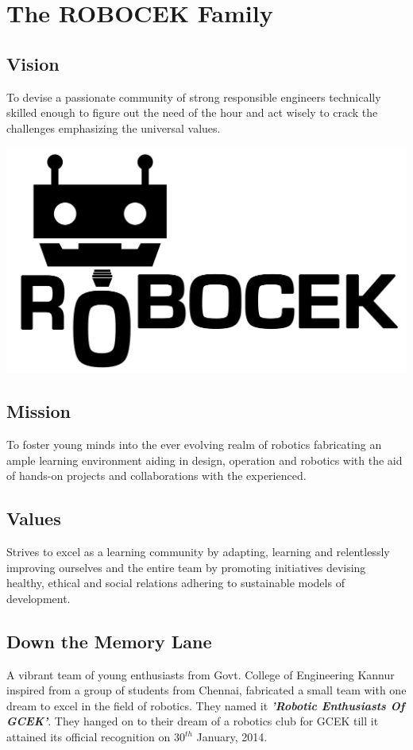 \cleardoublepage
\chapter{The ROBOCEK Family}
\section{Vision}
\justify
    To devise a passionate community of strong responsible engineers technically skilled enough to figure out the need of the hour and act wisely to crack the challenges emphasizing the universal values.
\begin{marginfigure}
    \includegraphics[width=\textwidth]{Images/ROBOCEK/ROBBOCEK_logo_black.png}
\end{marginfigure}

\section{Mission}
    To foster young minds into the ever evolving realm of robotics fabricating an ample learning environment aiding in design, operation and robotics with the aid of hands-on projects and collaborations with the experienced. 
\section{Values}
    Strives to excel as a learning community by adapting, learning and relentlessly improving ourselves and the entire team by promoting initiatives devising healthy, ethical and social relations adhering to sustainable models of development. 

\section{Down the Memory Lane}
\justify
A vibrant team of young enthusiasts from Govt. College of Engineering Kannur inspired from a group of students from Chennai, fabricated a small team with one dream to excel in the field of robotics. They named it \textit{\textbf{'Robotic Enthusiasts Of GCEK'}}. They hanged on to their dream of a robotics club for GCEK till it attained its official recognition on $30^{th}$ January, 2014.

